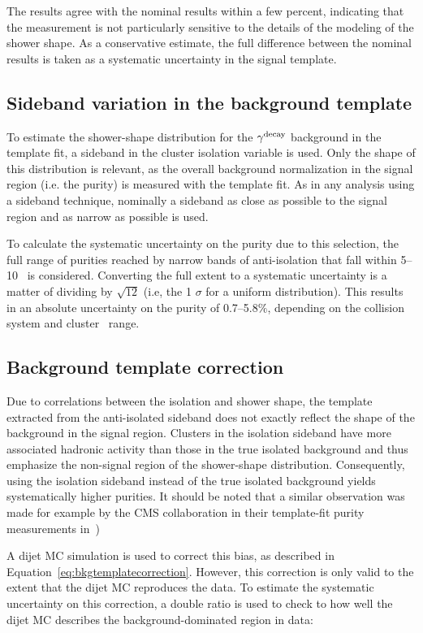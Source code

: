 The results agree with the nominal results within a few percent, indicating that the measurement is not particularly sensitive to the details of the modeling of the shower shape. As a conservative estimate, the full difference between the nominal results is taken as a systematic uncertainty in the signal template.

\FloatBarrier
\subsection{Sideband variation in the background template}
\label{sec:bkgtemplate}
To estimate the shower-shape distribution for the $\gamma^\mathrm{decay}$ background in the template fit, a sideband in the cluster isolation variable is used. Only the shape of this distribution is relevant, as the overall background normalization in the signal region (i.e. the purity) is measured with the template fit. As in any analysis using a sideband technique, nominally a sideband as close as possible to the signal region and as narrow as possible is used.

To calculate the systematic uncertainty on the purity due to this selection, the full range of purities reached by narrow bands of anti-isolation that fall within 5--10 \GeVc~is considered. Converting the full extent to a systematic uncertainty is a matter of dividing by $\sqrt{12}$ (i.e, the 1 $\sigma$ for a uniform distribution). This results in an absolute uncertainty on the purity of 0.7--5.8$\%$, depending on the collision system and cluster \pt~range.


\subsection{Background template correction}
\label{sec:bkgtemplatecorrection}
Due to correlations between the isolation and shower shape, the template extracted from the anti-isolated sideband does not exactly reflect the shape of the background in the signal region. Clusters in the isolation sideband have more associated hadronic activity than those in the true isolated background and thus emphasize the non-signal region of the shower-shape distribution. Consequently, using the isolation sideband instead of the true isolated background yields systematically higher purities. It should be noted that a similar observation was made for example by the CMS collaboration in their template-fit purity measurements in~\cite{Sirunyan:2017qhf})

A dijet MC simulation is used to correct this bias, as described in Equation~\ref{eq:bkgtemplatecorrection}. However, this correction is only valid to the extent that the dijet MC reproduces the data. To estimate the systematic uncertainty on this correction, a double ratio is used to check to how well the dijet MC describes the background-dominated region in data\cite{Erwann}: 

